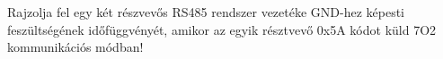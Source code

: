 \begin{example}

Rajzolja fel egy két részvevős RS485 rendszer vezetéke GND-hez képesti feszültségének időfüggvényét, amikor az egyik résztvevő 0x5A kódot küld 7O2 kommunikációs módban!

\tcbline
\vspace{1mm}

\solution

\end{example}